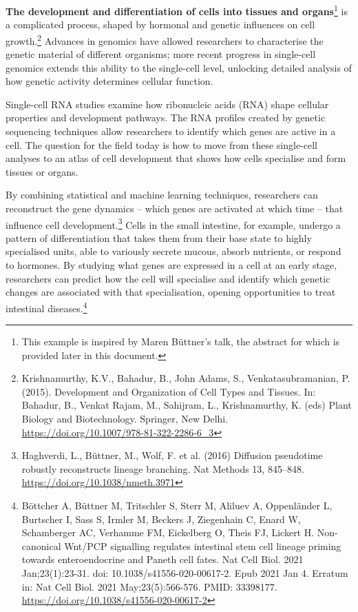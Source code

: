 \textbf{The development and differentiation of cells into tissues and
organs}\footnote{This example is inspired by Maren Büttner's talk, the
  abstract for which is provided later in this document.} is a
complicated process, shaped by hormonal and genetic influences on cell
growth.\footnote{Krishnamurthy, K.V., Bahadur, B., John Adams, S.,
  Venkatasubramanian, P. (2015). Development and Organization of Cell
  Types and Tissues. In: Bahadur, B., Venkat Rajam, M., Sahijram, L.,
  Krishnamurthy, K. (eds) Plant Biology and Biotechnology. Springer, New
  Delhi.
  \href{https://doi.org/10.1007/978-81-322-2286-6_3}{\uline{https://doi.org/10.1007/978-81-322-2286-6\_3}}}
Advances in genomics have allowed researchers to characterise the
genetic material of different organisms; more recent progress in
single-cell genomics extends this ability to the single-cell level,
unlocking detailed analysis of how genetic activity determines cellular
function.

Single-cell RNA studies examine how ribonucleic acids (RNA) shape
cellular properties and development pathways. The RNA profiles created
by genetic sequencing techniques allow researchers to identify which
genes are active in a cell. The question for the field today is how to
move from these single-cell analyses to an atlas of cell development
that shows how cells specialise and form tissues or organs.

By combining statistical and machine learning techniques, researchers
can reconstruct the gene dynamics -- which genes are activated at which
time -- that influence cell development.\footnote{Haghverdi, L.,
  Büttner, M., Wolf, F. et al. (2016) Diffusion pseudotime robustly
  reconstructs lineage branching. Nat Methods 13, 845--848.
  \href{https://doi.org/10.1038/nmeth.3971}{\uline{https://doi.org/10.1038/nmeth.3971}}}
Cells in the small intestine, for example, undergo a pattern of
differentiation that takes them from their base state to highly
specialised units, able to variously secrete mucous, absorb nutrients,
or respond to hormones. By studying what genes are expressed in a cell
at an early stage, researchers can predict how the cell will specialise
and identify which genetic changes are associated with that
specialisation, opening opportunities to treat intestinal
diseases.\footnote{Böttcher A, Büttner M, Tritschler S, Sterr M, Aliluev
  A, Oppenländer L, Burtscher I, Sass S, Irmler M, Beckers J, Ziegenhain
  C, Enard W, Schamberger AC, Verhamme FM, Eickelberg O, Theis FJ,
  Lickert H. Non-canonical Wnt/PCP signalling regulates intestinal stem
  cell lineage priming towards enteroendocrine and Paneth cell fates.
  Nat Cell Biol. 2021 Jan;23(1):23-31. doi: 10.1038/s41556-020-00617-2.
  Epub 2021 Jan 4. Erratum in: Nat Cell Biol. 2021 May;23(5):566-576.
  PMID: 33398177. \url{https://doi.org/10.1038/s41556-020-00617-2}}

